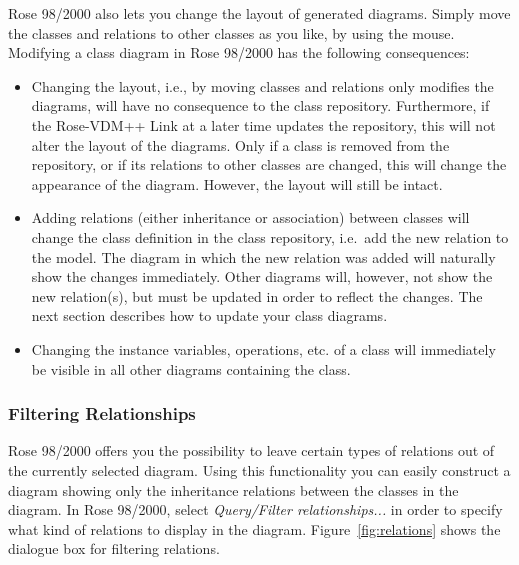 \documentclass[\pformat,12pt]{article}
\newcommand{\vdmpp}{VDM++}
\newcommand{\link}{Rose-\vdmpp{} Link}
\newcommand{\rose}{Rose 98/2000}
\begin{document}
\rose{} also lets you change the   
layout of generated diagrams. Simply move the classes and relations to other   
classes as you like, by using the mouse.  
Modifying a class diagram in \rose{} has the following consequences:  
\begin{itemize}
\item Changing the layout, i.e., by moving classes and relations only modifies the   
diagrams, will have no consequence to the class repository. Furthermore, if the   
\link{} at a later time updates the repository, this will not alter the   
layout of the diagrams. Only if a class is removed from the repository, or if its   
relations to other classes are changed, this will change the appearance of the   
diagram. However, the layout will still be intact.  
\item Adding relations (either inheritance or association) between
  classes will change the class definition in the class repository,
  i.e.\ add the new relation to the model.  The diagram in which the
  new relation was added will naturally show the changes immediately.
  Other diagrams will, however, not show the new relation(s), but must
  be updated in order to reflect the changes. The next section
  describes how to update your class diagrams.
\item Changing the instance variables, operations, etc. of a class will immediately be   
visible in all other diagrams containing the class.  
\end{itemize}

\subsubsection*{Filtering Relationships}
  
\rose{} offers you the possibility to leave certain types of relations out of the currently   
selected diagram. Using this functionality you can easily construct a diagram showing   
only the inheritance relations between the classes in the diagram.   
In \rose{}, select {\it Query/Filter relationships...} in order to specify what kind of relations   
to display in the diagram. Figure~\ref{fig:relations} shows the dialogue box for filtering relations.  
\end{document}
